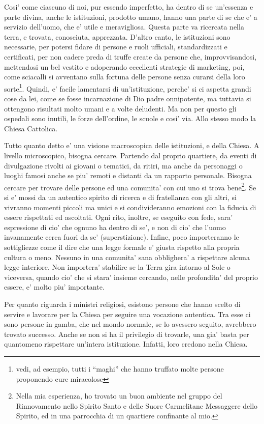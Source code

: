 Cosi' come ciascuno di noi, pur essendo imperfetto, ha dentro di se un'essenza e parte divina, anche le istituzioni, prodotto umano, hanno una parte di se che e' a servizio dell'uomo, che e' utile e meravigliosa. Questa parte va ricercata nella terra, e trovata, conosciuta, apprezzata. 
D'altro canto, le istituzioni sono necessarie, per potersi fidare di persone e ruoli ufficiali, standardizzati e certificati, per non cadere preda di truffe create da persone che, improvvisandosi, mettendosi un bel vestito e adoperando eccellenti strategie di marketing, poi, come sciacalli si avventano sulla fortuna delle persone senza curarsi della loro sorte\footnote{vedi, ad esempio, tutti i ``maghi'' che hanno truffato molte persone proponendo cure miracolose}.
Quindi, e' facile lamentarsi di un'istituzione, perche' si ci aspetta grandi cose da lei, come se fosse incarnazione di Dio padre onnipotente, ma tuttavia si ottengono risultati molto umani e a volte deludenti. Ma non per questo gli ospedali sono inutili, le forze dell'ordine, le scuole e cosi' via. Allo stesso modo la Chiesa Cattolica.

Tutto quanto detto e' una visione macroscopica delle istituzioni, e della Chiesa. A livello microscopico, bisogna cercare. Partendo dal proprio quartiere, da eventi di divulgazione rivolti ai giovani o tematici, da ritiri, ma anche da personaggi o luoghi famosi anche se piu' remoti e distanti da un rapporto personale. Bisogna cercare per trovare delle persone ed una comunita' con cui uno si trova bene\footnote{
    Nella mia esperienza, ho trovato un buon ambiente nel gruppo del Rinnovamento nello Spirito Santo e delle Suore Carmelitane Messaggere dello Spirito, ed in una parrocchia di un quartiere confinante al mio.
}.
Se si e' mossi da un autentico spirito di ricerca e di fratellanza con gli altri, si vivranno momenti piccoli ma unici e si condivideranno emozioni con la fiducia di essere rispettati ed ascoltati. Ogni rito, inoltre, se eseguito con fede, sara' espressione di cio' che ognuno ha dentro di se', e non di cio' che l'uomo invanamente cerca fuori da se' (superstizione). Infine, poco importeranno le sottigliezze come il dire che una legge formale e' giusta rispetto alla propria cultura o meno. Nessuno in una comunita' sana obblighera' a rispettare alcuna legge interiore. Non importera' stabilire se la Terra gira intorno al Sole o viceversa, quando cio' che si stara' insieme cercando, nelle profondita' del proprio essere, e' molto piu' importante.

Per quanto riguarda i ministri religiosi, esistono persone che hanno scelto di servire e lavorare per la Chiesa per seguire una vocazione autentica. Tra esse ci sono persone in gamba, che nel mondo normale, se lo avessero seguito, avrebbero trovato successo.
Anche se non si ha il privilegio di trovarle, una gia' basta per quantomeno rispettare un'intera istituzione. Infatti, loro credono nella Chiesa.

